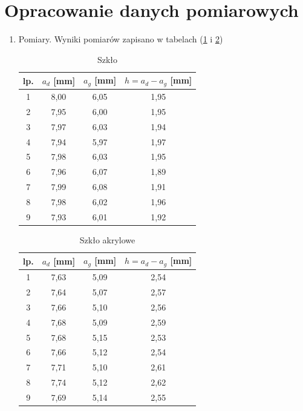 \documentclass [a4paper,11pt]{article}
\begin{document}
	\section{Opracowanie danych pomiarowych}\label{sec:opr}
	\begin{enumerate}[label=\alph*)]
		
		\item Pomiary. Wyniki pomiarów zapisano w tabelach (\ref{tab:szklo} i \ref{tab:pleksi})
		\begin{table}[!h]
			\caption{Szkło}
			\label{tab:szklo}
			\begin{center}
				\begin{tabular}{|c|c|c|c|}
					\hline lp. & $a_d$  [mm] & $a_g$ [mm] & $h = a_d - a_g$ [mm]  \\
					\hline 1 & 8,00 & 6,05 & 1,95 \\
					\hline 2 & 7,95 & 6,00 & 1,95 \\
					\hline 3 & 7,97 & 6,03 & 1,94 \\
					\hline 4 & 7,94 & 5,97 & 1,97 \\
					\hline 5 & 7,98 & 6,03 & 1,95 \\
					\hline 6 & 7,96 & 6,07 & 1,89 \\
					\hline 7 & 7,99 & 6,08 & 1,91 \\
					\hline 8 & 7,98 & 6,02 & 1,96 \\
					\hline 9 & 7,93 & 6,01 & 1,92 \\
					\hline 
				\end{tabular} 
			\end{center}
		\end{table}
		\begin{table}[!h]
			\caption{Szkło akrylowe}
			\label{tab:pleksi}
			\begin{center}
				\begin{tabular}{|c|c|c|c|}
					\hline lp. & $a_d$  [mm] & $a_g$ [mm] & $h = a_d - a_g$ [mm]  \\
					\hline 1 & 7,63 & 5,09 & 2,54 \\
					\hline 2 & 7,64 & 5,07 & 2,57 \\
					\hline 3 & 7,66 & 5,10 & 2,56 \\
					\hline 4 & 7,68 & 5,09 & 2,59 \\
					\hline 5 & 7,68 & 5,15 & 2,53 \\
					\hline 6 & 7,66 & 5,12 & 2,54 \\
					\hline 7 & 7,71 & 5,10 & 2,61 \\
					\hline 8 & 7,74 & 5,12 & 2,62 \\
					\hline 9 & 7,69 & 5,14 & 2,55 \\
					\hline 
				\end{tabular} 
			\end{center}
		\end{table}
		

\end{enumerate}
\end{document}
